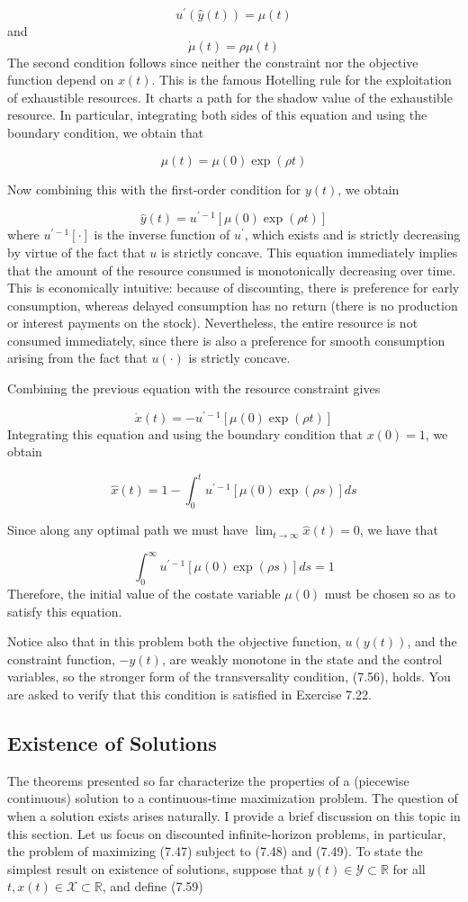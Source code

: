 \documentclass[\topdir/lecture_notes.tex]{subfiles}
\begin{document}
\[
u^{\prime}(\hat{y}(t))=\mu(t)
\]
and
\[
\dot{\mu}(t)=\rho \mu(t)
\]
The second condition follows since neither the constraint nor the objective function depend on $x(t)$. This is the famous Hotelling rule for the exploitation of exhaustible resources. It charts a path for the shadow value of the exhaustible resource. In particular, integrating both sides of this equation and using the boundary condition, we obtain that

\[
\mu(t)=\mu(0) \exp (\rho t)
\]

Now combining this with the first-order condition for $y(t)$, we obtain

\[
\hat{y}(t)=u^{\prime-1}[\mu(0) \exp (\rho t)]
\]
where $u^{\prime-1}[\cdot]$ is the inverse function of $u^{\prime}$, which exists and is strictly decreasing by virtue of the fact that $u$ is strictly concave. This equation immediately implies that the amount of the resource consumed is monotonically decreasing over time. This is economically intuitive: because of discounting, there is preference for early consumption, whereas delayed consumption has no return (there is no production or interest payments on the stock). Nevertheless, the entire resource is not consumed immediately, since there is also a preference for smooth consumption arising from the fact that $u(\cdot)$ is strictly concave.

Combining the previous equation with the resource constraint gives

\[
\dot{x}(t)=-u^{\prime-1}[\mu(0) \exp (\rho t)]
\]
Integrating this equation and using the boundary condition that $x(0)=1$, we obtain

\[
\hat{x}(t)=1-\int_{0}^{t} u^{\prime-1}[\mu(0) \exp (\rho s)] d s
\]

Since along any optimal path we must have $\lim _{t \rightarrow \infty} \hat{x}(t)=0$, we have that

\[
\int_{0}^{\infty} u^{\prime-1}[\mu(0) \exp (\rho s)] d s=1
\]
Therefore, the initial value of the costate variable $\mu(0)$ must be chosen so as to satisfy this equation.

Notice also that in this problem both the objective function, $u(y(t))$, and the constraint function, $-y(t)$, are weakly monotone in the state and the control variables, so the stronger form of the transversality condition, (7.56), holds. You are asked to verify that this condition is satisfied in Exercise 7.22.

\subsection{Existence of Solutions}
The theorems presented so far characterize the properties of a (piecewise continuous) solution to a continuous-time maximization problem. The question of when a solution exists arises naturally. I provide a brief discussion on this topic in this section. Let us focus on discounted infinite-horizon problems, in particular, the problem of maximizing (7.47) subject to (7.48) and (7.49). To state the simplest result on existence of solutions, suppose that $y(t) \in \mathcal{Y} \subset \mathbb{R}$ for all $t, x(t) \in \mathcal{X} \subset \mathbb{R}$, and define (7.59)
\end{document}
